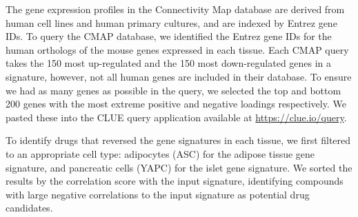 \documentclass[
]{article}
\begin{document}
The gene expression profiles in the Connectivity Map database are
derived from human cell lines and human primary cultures, and are
indexed by Entrez gene IDs. To query the CMAP database, we identified
the Entrez gene IDs for the human orthologs of the mouse genes expressed
in each tissue. Each CMAP query takes the 150 most up-regulated and the
150 most down-regulated genes in a signature, however, not all human
genes are included in their database. To ensure we had as many genes as
possible in the query, we selected the top and bottom 200 genes with the
most extreme positive and negative loadings respectively. We pasted
these into the CLUE query application available at
\url{https://clue.io/query}.

To identify drugs that reversed the gene signatures in each tissue, we
first filtered to an appropriate cell type: adipocytes (ASC) for the
adipose tissue gene signature, and pancreatic cells (YAPC) for the islet
gene signature. We sorted the results by the correlation score with the
input signature, identifying compounds with large negative correlations
to the input signature as potential drug candidates.
\end{document}
